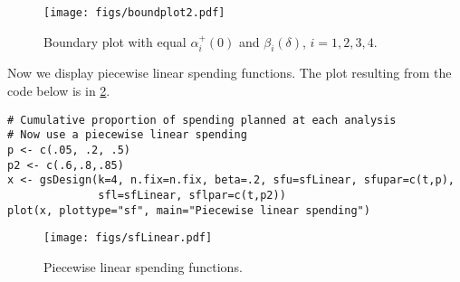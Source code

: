\begin{figure}
\begin{center}
\texttt{[image: figs/boundplot2.pdf]}
\end{center}
\caption{Boundary plot with equal $\alpha_i^+(0)$ and $\beta_i(\delta)$, $i=1, 2,3,4$.\label{fig:sfPoints}}
\end{figure}

Now we display piecewise linear spending functions. The plot resulting from the code below is in \ref{fig:sfLinear}.
\begin{verbatim}
# Cumulative proportion of spending planned at each analysis
# Now use a piecewise linear spending
p <- c(.05, .2, .5)
p2 <- c(.6,.8,.85)
x <- gsDesign(k=4, n.fix=n.fix, beta=.2, sfu=sfLinear, sfupar=c(t,p),
              sfl=sfLinear, sflpar=c(t,p2))
plot(x, plottype="sf", main="Piecewise linear spending")
\end{verbatim}

\begin{figure}
\begin{center}
\texttt{[image: figs/sfLinear.pdf]}
\end{center}
\caption{Piecewise linear spending functions.\label{fig:sfLinear}}
\end{figure}

